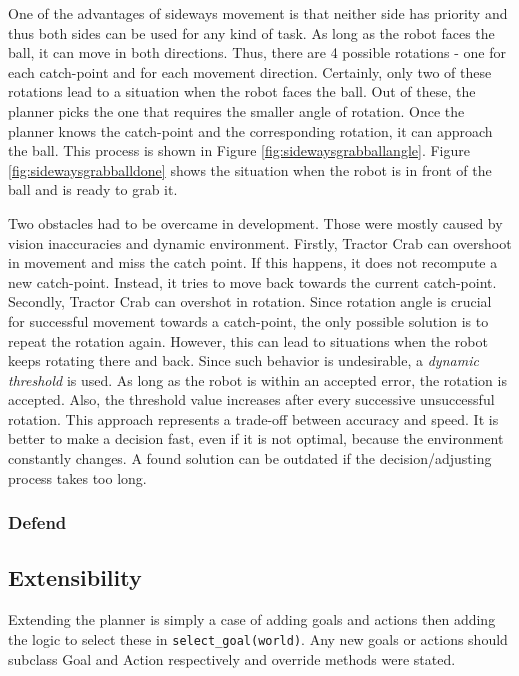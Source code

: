 One of the advantages of sideways movement is that neither side has priority and thus both sides can be used for any kind of task. As long as the robot faces the ball, it can move in both directions. Thus, there are 4 possible rotations - one for each catch-point and for each movement direction. Certainly, only two of these rotations lead to a situation when the robot faces the ball. Out of these, the planner picks the one that requires the smaller angle of rotation. Once the planner knows the catch-point and the corresponding rotation, it can approach the ball. This process is shown in Figure \ref{fig:sidewaysgrabballangle}. Figure \ref{fig:sidewaysgrabballdone} shows the situation when the robot is in front of the ball and is ready to grab it.

Two obstacles had to be overcame in development. Those were mostly caused by vision inaccuracies and dynamic environment. Firstly, Tractor Crab can overshoot in movement and miss the catch point. If this happens, it does not recompute a new catch-point. Instead, it tries to move back towards the current catch-point. Secondly, Tractor Crab can overshot in rotation. Since rotation angle is crucial for successful movement towards a catch-point, the only possible solution is to repeat the rotation again. However, this can lead to situations when the robot keeps rotating there and back. Since such behavior is undesirable, a \emph{dynamic threshold} is used. As long as the robot is within an accepted error, the rotation is accepted. Also, the threshold value increases after every successive unsuccessful rotation. This approach represents a trade-off between accuracy and speed. It is better to make a decision fast, even if it is not optimal, because the environment constantly changes. A found solution can be outdated if the decision/adjusting process takes too long.



\pagebreak
\subsubsection{Defend}



\subsection{Extensibility}

Extending the planner is simply a case of adding goals and actions then adding the logic to select these in \texttt{select\_goal(world)}. Any new goals or actions should subclass Goal and Action respectively and override methods were stated.

